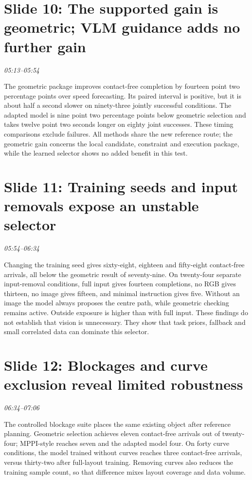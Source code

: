 \documentclass[a4paper,11pt]{article}
\begin{document}
\section*{Slide 10: The supported gain is geometric; VLM guidance adds no further gain}
\textit{05:13--05:54}

The geometric package improves contact-free completion by fourteen point two percentage points over speed forecasting. Its paired interval is positive, but it is about half a second slower on ninety-three jointly successful conditions. The adapted model is nine point two percentage points below geometric selection and takes twelve point two seconds longer on eighty joint successes. These timing comparisons exclude failures. All methods share the new reference route; the geometric gain concerns the local candidate, constraint and execution package, while the learned selector shows no added benefit in this test.

\section*{Slide 11: Training seeds and input removals expose an unstable selector}
\textit{05:54--06:34}

Changing the training seed gives sixty-eight, eighteen and fifty-eight contact-free arrivals, all below the geometric result of seventy-nine. On twenty-four separate input-removal conditions, full input gives fourteen completions, no RGB gives thirteen, no image gives fifteen, and minimal instruction gives five. Without an image the model always proposes the centre path, while geometric checking remains active. Outside exposure is higher than with full input. These findings do not establish that vision is unnecessary. They show that task priors, fallback and small correlated data can dominate this selector.

\section*{Slide 12: Blockages and curve exclusion reveal limited robustness}
\textit{06:34--07:06}

The controlled blockage suite places the same existing object after reference planning. Geometric selection achieves eleven contact-free arrivals out of twenty-four; MPPI-style reaches seven and the adapted model four. On forty curve conditions, the model trained without curves reaches three contact-free arrivals, versus thirty-two after full-layout training. Removing curves also reduces the training sample count, so that difference mixes layout coverage and data volume.
\end{document}
